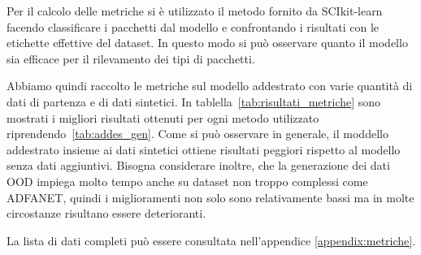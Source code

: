 Per il calcolo delle metriche si è utilizzato il metodo fornito da SCIkit-learn facendo classificare i pacchetti dal modello e confrontando i risultati con le etichette effettive del dataset. In questo modo si può osservare quanto il modello sia efficace per il rilevamento dei tipi di pacchetti.

Abbiamo quindi raccolto le metriche sul modello addestrato con varie quantità di dati di partenza e di dati sintetici. In tablella~\ref{tab:risultati_metriche} sono mostrati i migliori risultati ottenuti per ogni metodo utilizzato riprendendo~\ref{tab:addes_gen}. Come si può osservare in generale, il moddello addestrato insieme ai dati sintetici ottiene risultati peggiori rispetto al modello senza dati aggiuntivi. Bisogna considerare inoltre, che la generazione dei dati OOD impiega molto tempo  anche su dataset non troppo complessi come ADFANET, quindi i miglioramenti non solo sono relativamente bassi ma in molte circostanze risultano essere deterioranti.

La lista di dati completi può essere consultata nell'appendice \ref{appendix:metriche}.

